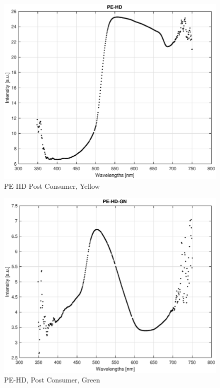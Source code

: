 \begin{appendices}
\begin{figure}
    \centering
    \includegraphics[width = 12cm]{Images/appendix/pe-hd-postconsum.eps}
    \caption[$\; \:$PE-HD Post Consumer, Yellow]{PE-HD Post Consumer, Yellow}
\end{figure}

\begin{figure}
    \centering
    \includegraphics[width = 12cm]{Images/appendix/pe-hd-postconsumer-green.eps}
    \caption[$\; \:$PE-HD Post Consumer, Green]{PE-HD, Post Consumer, Green}
\end{figure}


\end{appendices}
